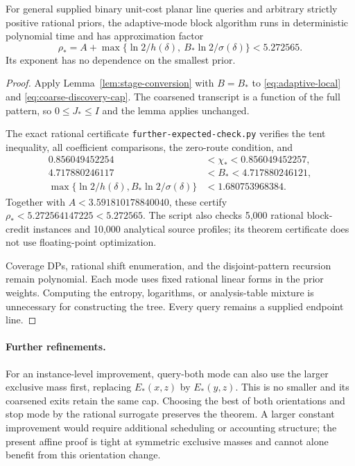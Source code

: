 \begin{theorem}
\label{thm:poly-adaptive-expected}
For general supplied binary unit-cost planar line queries and arbitrary
strictly positive rational priors, the adaptive-mode block algorithm
runs in deterministic polynomial time and has approximation factor
\[
 \boxed{\rho_*=
 A+\max\{\ln2/h(\delta),\ B_*\ln2/\sigma(\delta)\}<5.272565.}
\]
Its exponent has no dependence on the smallest prior.
\end{theorem}
\begin{proof}
Apply Lemma~\ref{lem:stage-conversion} with $B=B_*$ to
\eqref{eq:adaptive-local} and \eqref{eq:coarse-discovery-cap}.
The coarsened transcript is a function of the full pattern, so
$0\le J_*\le I$ and the lemma applies unchanged.

The exact rational certificate \texttt{further-expected-check.py}
verifies the tent inequality, all coefficient comparisons, the
zero-route condition, and
\[
 \begin{aligned}
 0.856049452254&<\chi_*<0.856049452257,\\
 4.717880246117&<B_*<4.717880246121,\\
 \max\{\ln2/h(\delta),B_*\ln2/\sigma(\delta)\}
 &<1.680753968384.
 \end{aligned}
\]
Together with $A<3.591810178840040$, these certify
$\rho_*<5.272564147225<5.272565$.
The script also checks 5,000 rational block-credit instances and
10,000 analytical source profiles; its theorem certificate does not
use floating-point optimization.

Coverage DPs, rational shift enumeration, and the disjoint-pattern
recursion remain polynomial. Each mode uses fixed rational linear
forms in the prior weights. Computing the entropy, logarithms, or
analysis-table mixture is unnecessary for constructing the tree.
Every query remains a supplied endpoint line.
\end{proof}

\paragraph{Further refinements.}
For an instance-level improvement, query-both mode can also use the
larger exclusive mass first, replacing $E_*(x,z)$ by $E_*(y,z)$.
This is no smaller and its coarsened exits retain the same cap.
Choosing the best of both orientations and stop mode by the rational
surrogate preserves the theorem. A larger constant improvement would
require additional scheduling or accounting structure; the present
affine proof is tight at symmetric exclusive masses and cannot alone
benefit from this orientation change.
